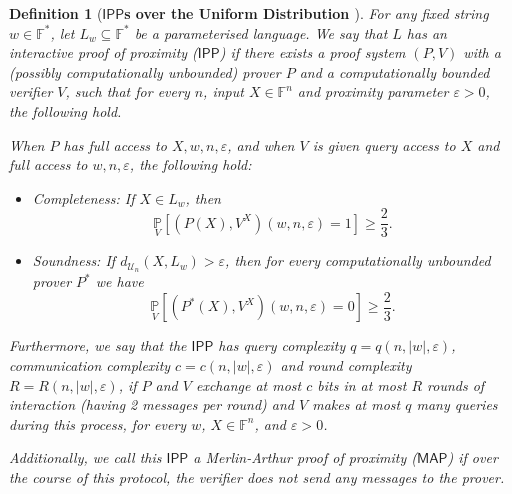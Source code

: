 \documentclass[11pt]{article}
\newtheorem{definition}{Definition}[section]
\newcommand{\IPP}{\mathsf{IPP}}
\newcommand{\MAP}{\mathsf{MAP}}
\newcommand{\F}{\mathbb{F}}
\begin{document}
\begin{definition}[\textbf{$\IPP$s over the Uniform Distribution \cite{EKR04, RVW}}]
\label{def:uniform_ipp}
For any fixed string $w \in \F^*$, let $L_w \subseteq \F^*$ be a parameterised language. We say that $L$ has an interactive proof of proximity ($\IPP$) if there exists a proof system $(P,V)$ with a (possibly computationally unbounded) prover $P$ and a computationally bounded verifier $V$, such that for every $n$, input $X \in \F^n$ and proximity parameter $\varepsilon > 0$, the following hold.

When $P$ has full access to $X,w,n,\varepsilon$, and when $V$ is given query access to $X$ and full access to $w,n,\varepsilon$, the following hold:
\begin{itemize}
    \item Completeness: If $X \in L_w$, then
    \begin{equation*}
        \underset{V}{\mathbb{P}}\left[ (P(X),V^{X})(w, n, \varepsilon)=1 \right]\geq \frac{2}{3}.
    \end{equation*}

    \item Soundness: If $d_{\mathcal{U}_{n}}(X, L_w)>\varepsilon$, then for every computationally unbounded prover $P^{\ast}$ we have 
    \begin{equation*}
        \underset{V}{\mathbb{P}}\left[(P^{\ast}(X),V^{X})(w,n,\varepsilon)=0\right]\geq \frac{2}{3}.
    \end{equation*}
\end{itemize}

Furthermore, we say that the $\IPP$ has \textit{query complexity} $q = q(n, \vert w \vert, \varepsilon)$, \textit{communication complexity} $c = c(n, \vert w \vert, \varepsilon)$ and \textit{round complexity} $R = R(n, \vert w \vert, \varepsilon)$, if $P$ and $V$ exchange at most $c$ bits in at most $R$ rounds of interaction (having 2 messages per round) and $V$ makes at most $q$ many queries during this process, for every $w$, $X \in \F^n$, and $\varepsilon > 0$.

Additionally, we call this $\IPP$ a Merlin-Arthur proof of proximity ($\MAP$) if over the course of this protocol, the verifier does not send any messages to the prover.
\end{definition}
\end{document}
